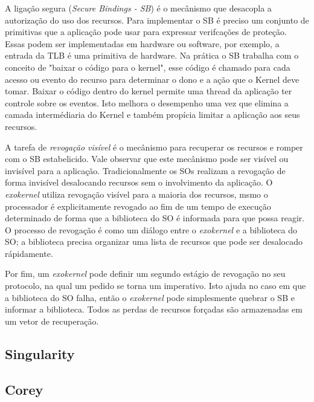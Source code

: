 A ligação segura (\emph{Secure Bindings - SB}) é o mecânismo que desacopla a
autorização do uso dos recursos. Para implementar o SB é preciso um conjunto de
primitivas que a aplicação pode usar para expressar verifcações de proteção.
Essas podem ser implementadas em hardware ou software, por exemplo, a entrada
da TLB é uma primitiva de hardware. Na prática o SB trabalha com o conceito de
"baixar o código para o kernel", esse código é chamado para cada acesso ou
evento do recurso para determinar o dono e a ação que o Kernel deve tomar.
Baixar o código dentro do kernel permite uma thread da aplicação ter controle
sobre os eventos. Isto melhora o desempenho uma vez que elimina a camada
intermédiaria do Kernel e também propícia limitar a aplicação aos seus
recursos.

A tarefa de \emph{revogação visível} é o mecânismo para recuperar os recursos
e romper com o SB estabelicido. Vale observar que este mecânismo pode ser
visível ou invisível para a aplicação. Tradicionalmente os SOs realizam a
revogação de forma invisível desalocando recursos sem o involvimento da
aplicação. O \emph{exokernel} utiliza revogação visível para a maioria dos
recursos, msmo o processador é explicitamente revogado ao fim de um tempo de
execução determinado de forma que a biblioteca do SO é informada para que possa
reagir. O processo de revogação é como um diálogo entre o \emph{exokernel} e a
biblioteca do SO; a biblioteca precisa organizar uma lista de recursos que pode
ser desalocado rápidamente.

Por fim, um \emph{exokernel} pode definir um segundo estágio de revogação no
seu protocolo, na qual um pedido se torna um imperativo. Isto ajuda no caso em
que a biblioteca do SO falha, então o \emph{exokernel} pode simplesmente
quebrar o SB e informar a biblioteca. Todos as perdas de recursos forçadas são
armazenadas em um vetor de recuperação.


\subsection{Singularity}

\subsection{Corey}
